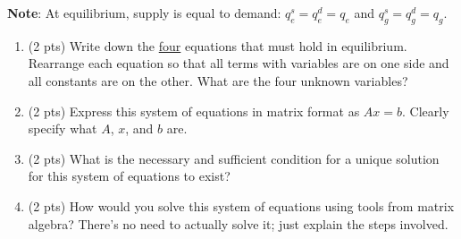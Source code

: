 \documentclass{./../../latex/tests}
\begin{document}
\begin{enumerate}
\textbf{Note}: At equilibrium, supply is equal to demand: \(q^s_e = q^d_e = q_e\) and \(q^s_g = q^d_g = q_g\).

\begin{enumerate}
\item (2 pts) Write down the \underline{four} equations that must hold in equilibrium. Rearrange each equation so that all terms with variables are on one side and all constants are on the other. What are the four unknown variables?

\newpage
\item (2 pts) Express this system of equations in matrix format as \(Ax = b\). Clearly specify what \(A\), \(x\), and \(b\) are.
\vspace{10cm}
\item (2 pts) What is the necessary and sufficient condition for a unique solution for this system of equations to exist?
\vspace{3cm}
\item (2 pts) How would you solve this system of equations using tools from matrix algebra? There's no need to actually solve it; just explain the steps involved.
\end{enumerate}


\end{enumerate}
\end{document}
